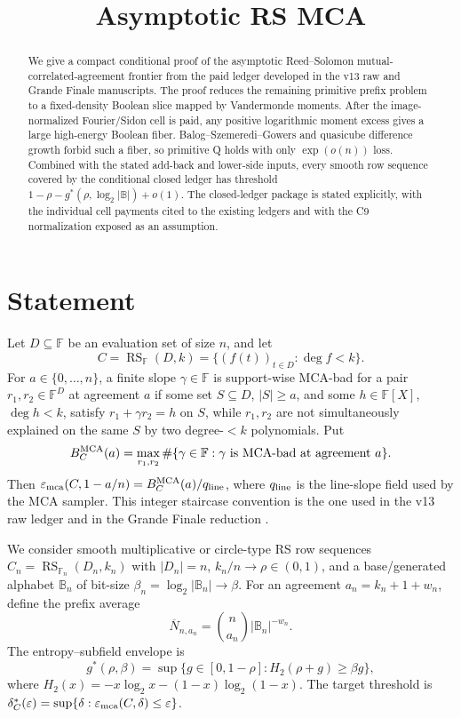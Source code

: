 \documentclass[11pt,a4paper]{amsart}
\title{Asymptotic RS MCA}
\date{}
\numberwithin{equation}{section}
\theoremstyle{remark}
\DeclareMathOperator{\RS}{RS}
\newcommand{\F}{\mathbb F}
\newcommand{\B}{\mathbb B}
\newcommand{\barN}{\overline N}
\newcommand{\eps}{\varepsilon}
\begin{document}
\begin{abstract}
We give a compact conditional proof of the asymptotic Reed--Solomon mutual-correlated-agreement frontier from the paid ledger developed in the v13 raw and Grande Finale manuscripts.  The proof reduces the remaining primitive prefix problem to a fixed-density Boolean slice mapped by Vandermonde moments.  After the image-normalized Fourier/Sidon cell is paid, any positive logarithmic moment excess gives a large high-energy Boolean fiber.  Balog--Szemeredi--Gowers and quasicube difference growth forbid such a fiber, so primitive Q holds with only \(\exp(o(n))\) loss.  Combined with the stated add-back and lower-side inputs, every smooth row sequence covered by the conditional closed ledger has threshold \(1-\rho-g^*(\rho,\log_2|\B|)+o(1)\).  The closed-ledger package is stated explicitly, with the individual cell payments cited to the existing ledgers and with the C9 normalization exposed as an assumption.
\end{abstract}

\maketitle

\section{Statement}

Let \(D\subseteq \F\) be an evaluation set of size \(n\), and let
\[
        C=\RS_{\F}(D,k)=\{(f(t))_{t\in D}:\deg f<k\}.
\]
For \(a\in\{0,\ldots,n\}\), a finite slope \(\gamma\in\F\) is support-wise MCA-bad for a pair \(r_1,r_2\in\F^D\) at agreement \(a\) if some set \(S\subseteq D\), \(|S|\ge a\), and some \(h\in\F[X]\), \(\deg h<k\), satisfy \(r_1+\gamma r_2=h\) on \(S\), while \(r_1,r_2\) are not simultaneously explained on the same \(S\) by two degree-\(<k\) polynomials.  Put
\[
        B_C^{\rm MCA}(a)
        =\max_{r_1,r_2}\#\{\gamma\in\F:\gamma\text{ is MCA-bad at agreement }a\}.
\]
Then \(\eps_{\rm mca}(C,1-a/n)=B_C^{\rm MCA}(a)/q_{\rm line}\), where \(q_{\rm line}\) is the line-slope field used by the MCA sampler.  This integer staircase convention is the one used in the v13 raw ledger \cite{Cho26CapV13} and in the Grande Finale reduction \cite{Cho26Grande}.

We consider smooth multiplicative or circle-type RS row sequences \(C_n=\RS_{\F_n}(D_n,k_n)\) with \(|D_n|=n\), \(k_n/n\to\rho\in(0,1)\), and a base/generated alphabet \(\B_n\) of bit-size \(\beta_n=\log_2|\B_n|\to\beta\).  For an agreement \(a_n=k_n+1+w_n\), define the prefix average
\[
        \barN_{n,a_n}=\binom n{a_n}|\B_n|^{-w_n}.
\]
The entropy--subfield envelope is
\[
        g^*(\rho,\beta)=\sup\{g\in[0,1-\rho]:H_2(\rho+g)\ge \beta g\},
\]
where \(H_2(x)=-x\log_2x-(1-x)\log_2(1-x)\).  The target threshold is \(\delta_C^*(\eps)=\sup\{\delta:\eps_{\rm mca}(C,\delta)\le\eps\}\).
\end{document}
